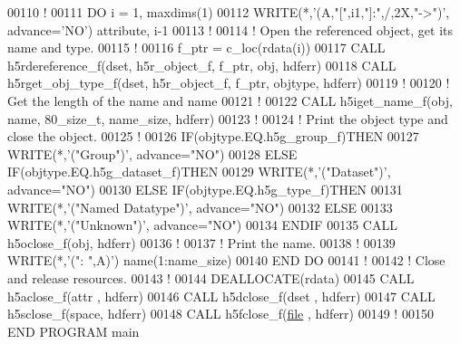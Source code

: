 \begin{DoxyCode}
00110   \textcolor{comment}{!}
00111   \textcolor{keywordflow}{DO} i = 1, maxdims(1)
00112      \textcolor{keyword}{WRITE}(*,\textcolor{stringliteral}{'(A,"[",i1,"]:",/,2X,"->")'}, advance=\textcolor{stringliteral}{'NO'}) attribute, i-1
00113      \textcolor{comment}{!}
00114      \textcolor{comment}{! Open the referenced object, get its name and type.}
00115      \textcolor{comment}{!}
00116      f\_ptr = c\_loc(rdata(i))
00117      \textcolor{keyword}{CALL }h5rdereference\_f(dset, h5r\_object\_f, f\_ptr, obj, hdferr)
00118      \textcolor{keyword}{CALL }h5rget\_obj\_type\_f(dset, h5r\_object\_f, f\_ptr, objtype, hdferr)
00119      \textcolor{comment}{!}
00120      \textcolor{comment}{! Get the length of the name and name}
00121      \textcolor{comment}{!}
00122      \textcolor{keyword}{CALL }h5iget\_name\_f(obj, name, 80\_size\_t, name\_size, hdferr)
00123      \textcolor{comment}{!}
00124      \textcolor{comment}{! Print the object type and close the object.}
00125      \textcolor{comment}{!}
00126      \textcolor{keywordflow}{IF}(objtype.EQ.h5g\_group\_f)\textcolor{keywordflow}{THEN}
00127         \textcolor{keyword}{WRITE}(*,\textcolor{stringliteral}{'("Group")'}, advance=\textcolor{stringliteral}{"NO"})
00128      \textcolor{keywordflow}{ELSE} \textcolor{keywordflow}{IF}(objtype.EQ.h5g\_dataset\_f)\textcolor{keywordflow}{THEN}
00129         \textcolor{keyword}{WRITE}(*,\textcolor{stringliteral}{'("Dataset")'}, advance=\textcolor{stringliteral}{"NO"})
00130      \textcolor{keywordflow}{ELSE} \textcolor{keywordflow}{IF}(objtype.EQ.h5g\_type\_f)\textcolor{keywordflow}{THEN}
00131         \textcolor{keyword}{WRITE}(*,\textcolor{stringliteral}{'("Named Datatype")'}, advance=\textcolor{stringliteral}{"NO"})
00132      \textcolor{keywordflow}{ELSE}
00133         \textcolor{keyword}{WRITE}(*,\textcolor{stringliteral}{'("Unknown")'}, advance=\textcolor{stringliteral}{"NO"})
00134 \textcolor{keywordflow}{     ENDIF}
00135      \textcolor{keyword}{CALL }h5oclose\_f(obj, hdferr)
00136      \textcolor{comment}{!}
00137      \textcolor{comment}{! Print the name.}
00138      \textcolor{comment}{!}
00139      \textcolor{keyword}{WRITE}(*,\textcolor{stringliteral}{'(": ",A)'}) name(1:name\_size)
00140 \textcolor{keywordflow}{  END DO}
00141   \textcolor{comment}{!}
00142   \textcolor{comment}{! Close and release resources.}
00143   \textcolor{comment}{!}
00144   \textcolor{keyword}{DEALLOCATE}(rdata)
00145   \textcolor{keyword}{CALL }h5aclose\_f(attr , hdferr)
00146   \textcolor{keyword}{CALL }h5dclose\_f(dset , hdferr)
00147   \textcolor{keyword}{CALL }h5sclose\_f(space, hdferr)
00148   \textcolor{keyword}{CALL }h5fclose\_f(\hyperlink{structfile}{file} , hdferr)
00149   \textcolor{comment}{!}
00150 \textcolor{keyword}{END PROGRAM }main
\end{DoxyCode}
